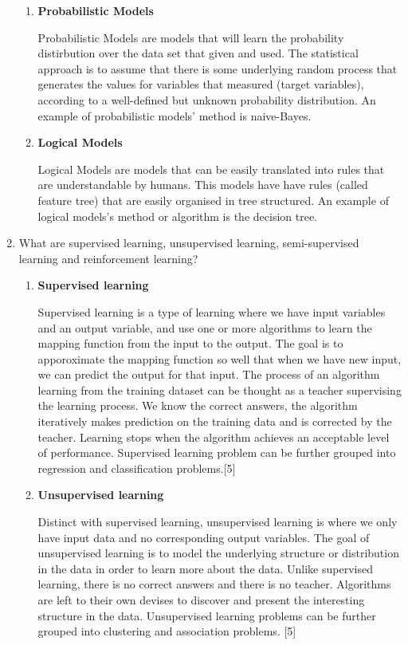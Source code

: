 \documentclass[12pt]{article}%
\begin{document}
\begin{enumerate}
\begin{enumerate}
		\item \textbf{Probabilistic Models}
		\par Probabilistic Models are models that will learn the probability distirbution over the data set that given and used. The statistical approach is to assume that there is some underlying random process that generates the values for variables that measured (target variables), according to a well-defined but unknown probability distribution. An example of probabilistic models' method is naive-Bayes.

		\item \textbf{Logical Models}
		\par Logical Models are models that can be easily translated into rules that are understandable by humans. This models have have rules (called feature tree) that are easily organised in tree structured. An example of logical models's method or algorithm is the decision tree.

	\end{enumerate}

	\item What are supervised learning, unsupervised learning, semi-supervised learning and reinforcement learning?

	\begin{enumerate}
		\item \textbf{Supervised learning}
		\par Supervised learning is a type of learning where we have input variables and an output variable, and use one or more algorithms to learn the mapping function from the input to the output. The goal is to apporoximate the mapping function so well that when we have new input, we can predict the output for that input. The process of an algorithm learning from the training dataset can be thought as a teacher supervising the learning process. We know the correct answers, the algorithm iteratively makes prediction on the training data and is corrected by the teacher. Learning stops when the algorithm achieves an acceptable level of performance. Supervised learning problem can be further grouped into regression and classification problems.[5]

		\item \textbf{Unsupervised learning}
		\par Distinct with supervised learning, unsupervised learning is where we only have input data and no corresponding output variables. The goal of unsupervised learning is to model the underlying structure or distribution in the data in order to learn more about the data. Unlike supervised learning, there is no correct answers and there is no teacher. Algorithms are left to their own devises to discover and present the interesting structure in the data. Unsupervised learning problems can be further grouped into clustering and association problems. [5]


\end{enumerate}
\end{enumerate}
\end{document}
